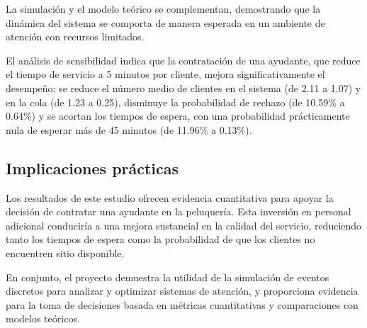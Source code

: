 \documentclass[12pt,a4paper]{article}
\begin{document}
La simulación y el modelo teórico se complementan, demostrando que la dinámica del sistema se comporta de manera esperada en un ambiente de atención con recursos limitados.

El análisis de sensibilidad indica que la contratación de una ayudante, que reduce el tiempo de servicio a 5 minutos por cliente, mejora significativamente el desempeño: se reduce el número medio de clientes en el sistema (de 2.11 a 1.07) y en la cola (de 1.23 a 0.25), disminuye la probabilidad de rechazo (de 10.59\% a 0.64\%) y se acortan los tiempos de espera, con una probabilidad prácticamente nula de esperar más de 45 minutos (de 11.96\% a 0.13\%).

\subsection{Implicaciones prácticas}

Los resultados de este estudio ofrecen evidencia cuantitativa para apoyar la decisión de contratar una ayudante en la peluquería. Esta inversión en personal adicional conduciría a una mejora sustancial en la calidad del servicio, reduciendo tanto los tiempos de espera como la probabilidad de que los clientes no encuentren sitio disponible.

En conjunto, el proyecto demuestra la utilidad de la simulación de eventos discretos para analizar y optimizar sistemas de atención, y proporciona evidencia para la toma de decisiones basada en métricas cuantitativas y comparaciones con modelos teóricos.
\end{document}
